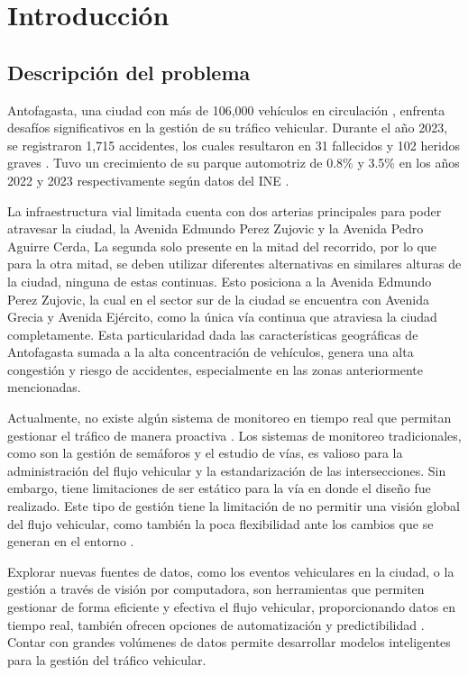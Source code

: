 \documentclass[12pt]{article}
\begin{document}
\section{Introducción}
\subsection{Descripción del problema}

Antofagasta, una ciudad con más de 106,000 vehículos en circulación \citep{comision2023}, enfrenta desafíos significativos en la gestión de su tráfico vehicular. Durante el año 2023, se registraron 1,715 accidentes, los cuales resultaron en 31 fallecidos y 102 heridos graves \citep{comision2023}. Tuvo un crecimiento de su parque automotriz de 0.8\% y 3.5\% en los años 2022 y 2023 respectivamente según datos del INE \citep{ine2023}.

La infraestructura vial limitada cuenta con dos arterias principales para poder atravesar la ciudad, la Avenida Edmundo Perez Zujovic y la Avenida Pedro Aguirre Cerda, La segunda solo presente en la mitad del recorrido, por lo que para la otra mitad, se deben utilizar diferentes alternativas en similares alturas de la ciudad, ninguna de estas continuas. Esto posiciona a la Avenida Edmundo Perez Zujovic, la cual en el sector sur de la ciudad se encuentra con Avenida Grecia y Avenida Ejército, como la única vía continua que atraviesa la ciudad completamente. Esta particularidad dada las características geográficas de Antofagasta sumada a la alta concentración de vehículos, genera una alta congestión y  riesgo de accidentes, especialmente en las zonas anteriormente mencionadas.

Actualmente, no existe algún sistema de monitoreo en tiempo real que permitan gestionar el tráfico de manera proactiva \citep{goodall2019}. Los sistemas de monitoreo tradicionales, como son la gestión de semáforos y el estudio de vías, es valioso para la administración del flujo vehicular y la estandarización de las intersecciones. Sin embargo, tiene limitaciones de ser estático para la vía en donde el diseño fue realizado. Este tipo de gestión tiene la limitación de no permitir una visión global del flujo vehicular, como también la poca flexibilidad ante los cambios que se generan en el entorno \citep{auld2009}.

Explorar nuevas fuentes de datos, como los eventos vehiculares en la ciudad, o la gestión a través de visión por computadora, son herramientas que permiten gestionar de forma eficiente y efectiva el flujo vehicular, proporcionando datos en tiempo real, también ofrecen opciones de automatización y predictibilidad \citep{chen2015}. Contar con grandes volúmenes de datos permite desarrollar modelos inteligentes para la gestión del tráfico vehicular.
\end{document}
